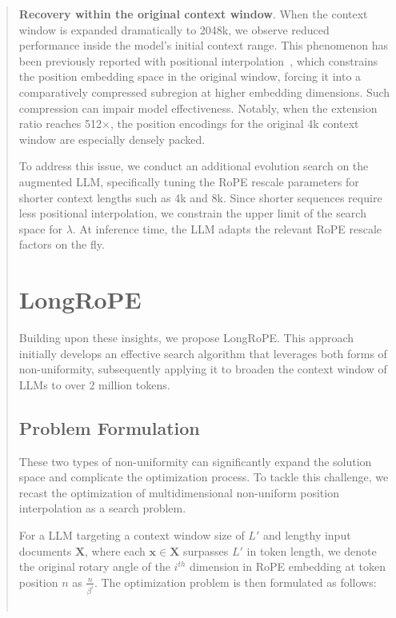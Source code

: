 \begin{abstract}
\textbf{Recovery within the original context window}. When the context window is expanded dramatically to 2048k, we observe reduced performance inside the model's initial context range. This phenomenon has been previously reported with positional interpolation~\cite{pi}, which constrains the position embedding space in the original window, forcing it into a comparatively compressed subregion at higher embedding dimensions. Such compression can impair model effectiveness. Notably, when the extension ratio reaches 512$\times$, the position encodings for the original 4k context window are especially densely packed.

To address this issue, we conduct an additional evolution search on the augmented LLM, specifically tuning the RoPE rescale parameters for shorter context lengths such as 4k and 8k. Since shorter sequences require less positional interpolation, we constrain the upper limit of the search space for $\lambda$. At inference time, the LLM adapts the relevant RoPE rescale factors on the fly.

\section{LongRoPE}

\label{sec:method}
Building upon these insights, we propose LongRoPE. This approach initially develops an effective search algorithm that leverages both forms of non-uniformity, subsequently applying it to broaden the context window of LLMs to over 2 million tokens.

\subsection{Problem Formulation}

These two types of non-uniformity can significantly expand the solution space and complicate the optimization process. To tackle this challenge, we recast the optimization of multidimensional non-uniform position interpolation as a search problem.

For a LLM targeting a  context window size of $L'$ and lengthy input documents $\mathbf{X}$, where each $\mathbf{x}\in\mathbf{X}$ surpasses $L'$ in token length, we denote the original rotary angle of the $i^{th}$ dimension in RoPE embedding at token position $n$ as  $\frac{n}{\beta^i}$. The optimization problem is then formulated as follows:

\begin{equation}
\begin{gathered}
		\label{eq:problem}


\end{gathered}
\end{equation}
\end{abstract}
